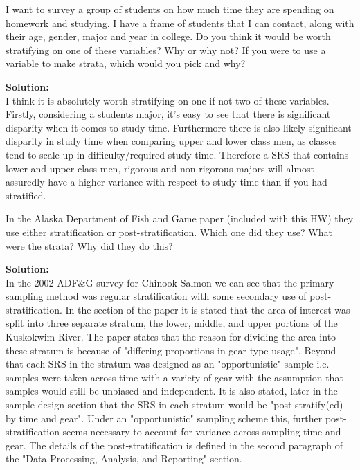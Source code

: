 \documentclass[12pt]{article}
\makeatletter
\theoremstyle{homework}
\newenvironment{exercise}[1]
{\def\@currentlabel{#1}\exercisecore}
{\endexercisecore}
\newcommand{\localhead}[1]{\par\smallskip\noindent\textbf{#1}\nobreak\\}%
\newcommand\solution{\localhead{Solution:}}
\makeatother
\begin{document}
\begin{exercise}{1} I want to survey a group of students on how much time they are 
    spending on homework and studying. I have a frame of students that I can contact,
    along with their age, gender, major and year in college. Do you think it would be
    worth stratifying on one of these variables? Why or why not? If you were to use
    a variable to make strata, which would you pick and why?\\
    \solution I think it is absolutely worth stratifying on one if not two of these variables. 
    Firstly, considering a students major, it's easy to see that there is significant disparity 
    when it comes to study time. Furthermore there is also likely significant disparity in study time
    when comparing upper and lower class men, as classes tend to scale up in difficulty/required study time.  
    Therefore a SRS that contains lower and upper class men, rigorous and non-rigorous majors will almost assuredly 
    have a higher variance with respect to study time than if you had stratified.
\end{exercise}
\vspace{1in}

\begin{exercise}{2}In the Alaska Department of Fish and Game paper (included with this HW)
    they use either stratification or post-stratification. Which one did they use?
    What were the strata? Why did they do this?\\
    \solution In the 2002 ADF\&G survey for Chinook Salmon we can see that the primary sampling method was 
    regular stratification with some secondary use of post-stratification. In the section of the paper it is stated that the area of interest was split 
    into three separate stratum, the lower, middle, and upper portions of the Kuskokwim River. The paper states
    that the reason for dividing the area into these stratum is because of "differing  proportions in gear type usage".
    Beyond that each SRS in the stratum was designed as an "opportunistic" sample i.e. samples were taken across time with a 
    variety of gear with the assumption that samples would still be unbiased and independent. It is also stated, later in the sample
    design section that the SRS in each stratum would be "post stratify(ed) by time and gear". Under an "opportunistic" sampling 
    scheme this, further post-stratification seems necessary to account for variance across sampling time and gear. The details of the 
    post-stratification is defined in the second paragraph of the "Data Processing, Analysis, and Reporting" section. 
\end{exercise}
\vspace{1in}
\end{document}
